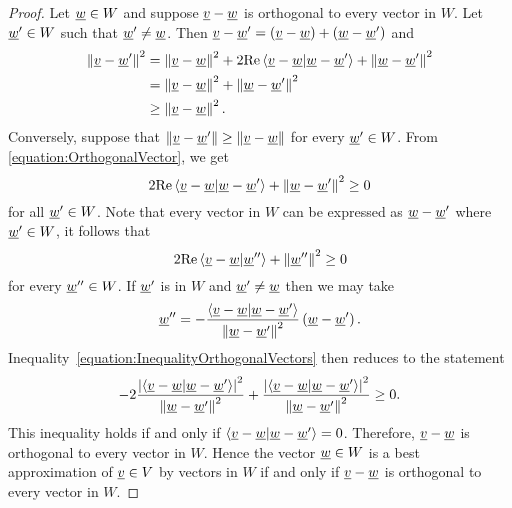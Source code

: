 \begin{proof}
Let $\underline{w} \in W$ and suppose $\underline{v} - \underline{w}$ is orthogonal to every vector in $W$.
Let $\underline{w}' \in W$ such that $\underline{w}' \neq \underline{w}$.
Then $\underline{v} - \underline{w}' = \left( \underline{v} - \underline{w} \right) + \left( \underline{w} - \underline{w}' \right)$ and
\begin{equation} \label{equation:OrthogonalVector}
\begin{split}
\left\| \underline{v} - \underline{w}' \right\|^2
&= \left\| \underline{v} - \underline{w} \right\|^2
+ 2 \mathrm{Re} \left\langle \underline{v} - \underline{w} | \underline{w} - \underline{w}' \right\rangle
+ \left\| \underline{w} - \underline{w}' \right\|^2 \\
&= \left\| \underline{v} - \underline{w} \right\|^2
+ \left\| \underline{w} - \underline{w}' \right\|^2 \\
&\geq \left\| \underline{v} - \underline{w} \right\|^2.
\end{split}
\end{equation}
Conversely, suppose that $\left\| \underline{v} - \underline{w}' \right\| \geq \left\| \underline{v} - \underline{w} \right\|$ for every $\underline{w}' \in W$.
From \eqref{equation:OrthogonalVector}, we get
\begin{equation*}
2 \mathrm{Re} \left\langle \underline{v} - \underline{w} | \underline{w} - \underline{w}' \right\rangle
+ \left\| \underline{w} - \underline{w}' \right\|^2 \geq 0
\end{equation*}
for all $\underline{w}' \in W$.
Note that every vector in $W$ can be expressed as $\underline{w} - \underline{w}'$ where $\underline{w}' \in W$, it follows that
\begin{equation} \label{equation:InequalityOrthogonalVectors}
2 \mathrm{Re} \left\langle \underline{v} - \underline{w} | \underline{w}'' \right\rangle
+ \left\| \underline{w}'' \right\|^2 \geq 0
\end{equation}
for every $\underline{w}'' \in W$.
If $\underline{w}'$ is in $W$ and $\underline{w}' \neq \underline{w}$ then we may take
\begin{equation*}
\underline{w}'' = - \frac{ \left\langle \underline{v} - \underline{w} | \underline{w} - \underline{w}' \right\rangle }{ \left\| \underline{w} - \underline{w}' \right\|^2 } \left( \underline{w} - \underline{w}' \right).
\end{equation*}
Inequality~\eqref{equation:InequalityOrthogonalVectors} then reduces to the statement
\begin{equation*}
- 2 \frac{ \left| \left\langle \underline{v} - \underline{w} | \underline{w} - \underline{w}' \right\rangle \right|^2 }{ \left\| \underline{w} - \underline{w}' \right\|^2 }
+ \frac{ \left| \left\langle \underline{v} - \underline{w} | \underline{w} - \underline{w}' \right\rangle \right|^2 }{ \left\| \underline{w} - \underline{w}' \right\|^2 }
\geq 0.
\end{equation*}
This inequality holds if and only if $\left\langle \underline{v} - \underline{w} | \underline{w} - \underline{w}' \right\rangle = 0$.
Therefore, $\underline{v} - \underline{w}$ is orthogonal to every vector in $W$.
Hence the vector $\underline{w} \in W$ is a best approximation of $\underline{v} \in V$ by vectors in $W$ if and only if $\underline{v} - \underline{w}$ is orthogonal to every vector in $W$.


\end{proof}
